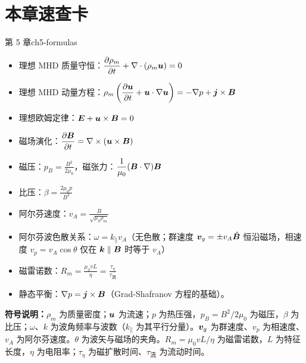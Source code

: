 \section*{本章速查卡}
{}
\begin{formulabox}{第 5 章}{ch5-formulas}
\begin{itemize}[leftmargin=*,itemsep=0pt]
\item 理想 MHD 质量守恒：$\displaystyle\frac{\partial\rho_m}{\partial t} + \nabla\cdot(\rho_m\bm{u}) = 0$
\item 理想 MHD 动量方程：$\displaystyle\rho_m\left(\frac{\partial\bm{u}}{\partial t} + \bm{u}\cdot\nabla\bm{u}\right) = -\nabla p + \bm{j}\times\bm{B}$
\item 理想欧姆定律：$\displaystyle\bm{E} + \bm{u}\times\bm{B} = 0$
\item 磁场演化：$\displaystyle\frac{\partial\bm{B}}{\partial t} = \nabla\times(\bm{u}\times\bm{B})$
\item 磁压：$\displaystyle p_B = \frac{B^2}{2\mu_0}$，磁张力：$\displaystyle\frac{1}{\mu_0}(\bm{B}\cdot\nabla)\bm{B}$
\item 比压：$\displaystyle\beta = \frac{2\mu_0 p}{B^2}$
\item 阿尔芬速度：$\displaystyle v_A = \frac{B}{\sqrt{\mu_0\rho_m}}$
\item 阿尔芬波色散关系：$\displaystyle\omega = k_\parallel v_A$（无色散；群速度 $\bm{v}_g=\pm v_A\hat{\bm{B}}$ 恒沿磁场，相速度 $v_p=v_A\cos\theta$ 仅在 $\bm{k}\parallel\bm{B}$ 时等于 $v_A$）
\item 磁雷诺数：$\displaystyle R_m = \frac{\mu_0 v L}{\eta} = \frac{\tau_\eta}{\tau_{\text{流}}}$
\item 静态平衡：$\displaystyle\nabla p = \bm{j}\times\bm{B}$（Grad-Shafranov 方程的基础）。
\end{itemize}
\textbf{符号说明：}$\rho_m$ 为质量密度；$\bm{u}$ 为流速；$p$ 为热压强，$p_B=B^2/2\mu_0$ 为磁压，$\beta$ 为比压；$\omega$、$k$ 为波角频率与波数（$k_\parallel$ 为其平行分量）。$\bm{v}_g$ 为群速度、$v_p$ 为相速度、$v_A$ 为阿尔芬速度。$\theta$ 为波矢与磁场的夹角。$R_m=\mu_0vL/\eta$ 为磁雷诺数，$L$ 为特征长度，$\eta$ 为电阻率；$\tau_\eta$ 为磁扩散时间、$\tau_{\text{流}}$ 为流动时间。
\end{formulabox}

